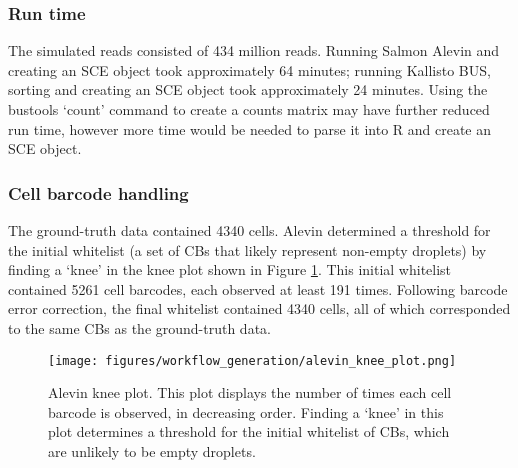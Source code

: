 
\subsubsection{Run time}
The simulated reads consisted of 434 million reads.
Running Salmon Alevin and creating an SCE object took approximately 64 minutes;
running Kallisto BUS, sorting and creating an SCE object took approximately 24 minutes.
Using the bustools `count' command to create a counts matrix may have further reduced run time, however more time would be needed to parse it into R and create an SCE object.

\subsubsection{Cell barcode handling}
The ground-truth data contained 4340 cells.
Alevin determined a threshold for the initial whitelist (a set of CBs that likely represent non-empty droplets) by finding a `knee' in the knee plot shown in Figure \ref{fig:alevin_knee}.
This initial whitelist contained 5261 cell barcodes, each observed at least 191 times.
Following barcode error correction, the final whitelist contained 4340 cells, all of which corresponded to the same CBs as the ground-truth data.

\begin{figure}[htb]
    \centering
    \texttt{[image: figures/workflow\_generation/alevin\_knee\_plot.png]}
    \caption[Salmon Alevin knee plot]{Alevin knee plot.
    This plot displays the number of times each cell barcode is observed, in decreasing order.
    Finding a `knee' in this plot determines a threshold for the initial whitelist of CBs, which are unlikely to be empty droplets.}
    \label{fig:alevin_knee}
\end{figure}

